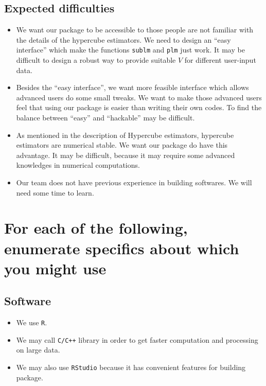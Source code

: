 \documentclass[draft]{article}
\begin{document}
\subsection{Expected difficulties}
\begin{itemize}

	\item We want our package to be accessible to those people are not familiar with the details of the hypercube estimators. We need to design an ``easy interface'' which make the functions {\tt sublm} and {\tt plm} just work. It may be difficult to design a robust way to provide suitable $V$ for different user-input data.

	\item Besides the ``easy interface'', we want more feasible interface which allows advanced users do some small tweaks. We want to make those advanced users feel that using our package is easier than writing their own codes. To find the balance between ``easy'' and ``hackable'' may be difficult.

	\item As mentioned in the description of Hypercube estimators, hypercube estimators are numerical stable. We want our package do have this advantage. It may be difficult, because it may require some advanced knowledges in numerical computations.

	\item Our team does not have previous experience in building softwares. We will need some time to learn.

\end{itemize}


\section{For each of the following, enumerate specifics about which you might use}


\subsection{Software}
\begin{itemize}
	\item We use {\tt R}.
	\item We may call {\tt C/C++} library in order to get faster computation and processing on large data.
	\item We may also use \texttt{RStudio} because it has convenient features for building package.
\end{itemize}
\end{document}
